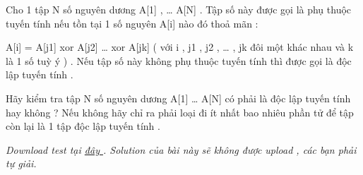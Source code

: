 Cho 1 tập N số nguyên dương A[1] , … A[N] . Tập số này được gọi là phụ thuộc tuyến tính nếu tồn tại 1 số nguyên A[i] nào đó thoả mãn :   


   A[i] = A[j1] xor A[j2] … xor A[jk] ( với i , j1 , j2 , … , jk  đôi một khác nhau và k là 1 số tuỳ ý ) . Nếu tập số này không phụ thuộc tuyến tính thì được gọi là độc lập tuyến tính .   


   Hãy kiểm tra tập N số nguyên dương A[1] … A[N] có phải là độc lập tuyến tính hay không ? Nếu không hãy chỉ ra phải loại đi ít nhất bao nhiêu phần tử để tập còn lại là 1 tập độc lập tuyến tính .   





\textit{    Download test tại    \href{http://vn.spoj.pl/content/XOR.rar}{     đây    }    . Solution của bài này sẽ không được upload , các bạn phải tự giải.   }